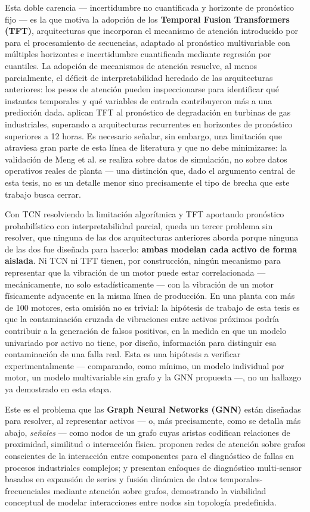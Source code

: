 \documentclass[11pt]{article}
\begin{document}
Esta doble carencia --- incertidumbre no cuantificada y horizonte de pronóstico fijo --- es la que motiva la adopción de los \textbf{Temporal Fusion Transformers (TFT)}, arquitecturas que incorporan el mecanismo de atención introducido por \citet{vaswani2017} para el procesamiento de secuencias, adaptado al pronóstico multivariable con múltiples horizontes e incertidumbre cuantificada mediante regresión por cuantiles. La adopción de mecanismos de atención resuelve, al menos parcialmente, el déficit de interpretabilidad heredado de las arquitecturas anteriores: los pesos de atención pueden inspeccionarse para identificar qué instantes temporales y qué variables de entrada contribuyeron más a una predicción dada. \citet{meng2024} aplican TFT al pronóstico de degradación en turbinas de gas industriales, superando a arquitecturas recurrentes en horizontes de pronóstico superiores a 12 horas. Es necesario señalar, sin embargo, una limitación que atraviesa gran parte de esta línea de literatura y que no debe minimizarse: la validación de Meng et al. se realiza sobre datos de simulación, no sobre datos operativos reales de planta --- una distinción que, dado el argumento central de esta tesis, no es un detalle menor sino precisamente el tipo de brecha que este trabajo busca cerrar.

Con TCN resolviendo la limitación algorítmica y TFT aportando pronóstico probabilístico con interpretabilidad parcial, queda un tercer problema sin resolver, que ninguna de las dos arquitecturas anteriores aborda porque ninguna de las dos fue diseñada para hacerlo: \textbf{ambas modelan cada activo de forma aislada}. Ni TCN ni TFT tienen, por construcción, ningún mecanismo para representar que la vibración de un motor puede estar correlacionada --- mecánicamente, no solo estadísticamente --- con la vibración de un motor físicamente adyacente en la misma línea de producción. En una planta con más de 100 motores, esta omisión no es trivial: la hipótesis de trabajo de esta tesis es que la contaminación cruzada de vibraciones entre activos próximos podría contribuir a la generación de falsos positivos, en la medida en que un modelo univariado por activo no tiene, por diseño, información para distinguir esa contaminación de una falla real. Esta es una hipótesis a verificar experimentalmente --- comparando, como mínimo, un modelo individual por motor, un modelo multivariable sin grafo y la GNN propuesta ---, no un hallazgo ya demostrado en esta etapa.

Este es el problema que las \textbf{Graph Neural Networks (GNN)} están diseñadas para resolver, al representar activos --- o, más precisamente, como se detalla más abajo, \textit{señales} --- como nodos de un grafo cuyas aristas codifican relaciones de proximidad, similitud o interacción física. \citet{chen2023} proponen redes de atención sobre grafos conscientes de la interacción entre componentes para el diagnóstico de fallas en procesos industriales complejos; \citet{he2026} y \citet{duan2025} presentan enfoques de diagnóstico multi-sensor basados en expansión de series y fusión dinámica de datos temporales-frecuenciales mediante atención sobre grafos, demostrando la viabilidad conceptual de modelar interacciones entre nodos sin topología predefinida.
\end{document}
